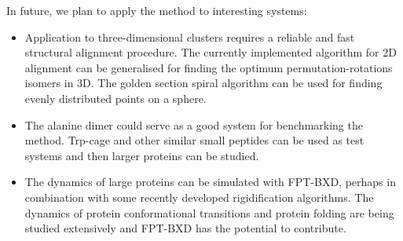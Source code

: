 In future, we plan to apply the method to interesting systems:
\begin{itemize}
\item Application to three-dimensional clusters requires a reliable and fast structural alignment procedure. The currently implemented algorithm for 2D alignment can be generalised for finding the optimum permutation-rotations isomers in 3D. The golden section spiral algorithm can be used for finding evenly distributed points on a sphere.\cite{Saff1997}

\item The alanine dimer could serve as a good system for benchmarking the method. Trp-cage and other similar small peptides can be used as test systems and then larger proteins can be studied.

\item The dynamics of large proteins can be simulated with FPT-BXD, perhaps in combination with some recently developed rigidification algorithms.\cite{Noid2008, Kusumaatmaja2012} The dynamics of protein conformational transitions and protein folding are being studied extensively\cite{Best2012, Dill2012} and FPT-BXD has the potential to contribute.

\end{itemize}


